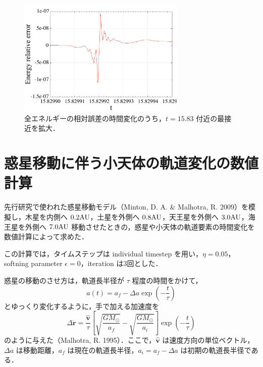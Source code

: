 \documentclass[11pt,a4paper,oneside,onecolumn]{jreport}
\begin{document}
\begin{figure}[H]
\centering
\includegraphics[width=8cm]{./image/pythagoras_E_error_detail.pdf}
\caption{全エネルギーの相対誤差の時間変化のうち，$t = 15.83$ 付近の最接近を拡大．\label{fig:pythagoras_E_error_detail}}
\end{figure}

\section{惑星移動に伴う小天体の軌道変化の数値計算}
先行研究で使われた惑星移動モデル（Minton, D. A. \& Malhotra, R. 2009）を模擬し，木星を内側へ $0.2 {\rm AU}$，土星を外側へ $0.8 {\rm AU}$，天王星を外側へ $3.0 {\rm AU}$，海王星を外側へ $7.0 {\rm AU}$ 移動させたときの，惑星や小天体の軌道要素の時間変化を数値計算によって求めた．

この計算では，タイムステップは individual timestep を用い，$\eta = 0.05$，softning parameter $\epsilon = 0$，iteration は3回とした．

惑星の移動のさせ方は，軌道長半径が $\tau$ 程度の時間をかけて，
\begin{equation}
a (t) = a_f - \Delta a \exp \left( - \frac{t}{\tau} \right) \label{eq:a(t)}
\end{equation}
とゆっくり変化するように，手で加える加速度を
\begin{equation}
\Delta \ddot{\bm r} = \frac{\hat{{\bm v}}}{\tau} \left[ \sqrt{\frac{G M_{\odot}}{a_f}} - \sqrt{\frac{G M_{\odot}}{a_i}} \right] \exp \left(- \frac{t}{\tau} \right) \label{eq:delta_rddot}
\end{equation}
のように与えた（Malhotra, R. 1995）．ここで，$\hat{{\bm v}}$ は速度方向の単位ベクトル，$\Delta a$ は移動距離，$a_f$ は現在の軌道長半径，$a_i = a_f - \Delta a$ は初期の軌道長半径である．
\end{document}
